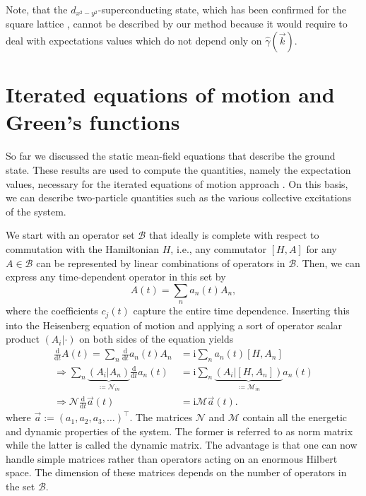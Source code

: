 \documentclass[
    reprint, 
    aps,
    preprintnumbers,
    twocolumn,
    prb,
    superscriptaddress
]{revtex4-2}
\newcommand{\vk}{\vec{k}}
\newcommand{\im}{\mathrm{i}}
\newcommand{\ddt}{\frac{\mathrm{d}}{\mathrm{d}t}}
\newcommand{\mM}{\mathcal{M}}
\newcommand{\mN}{\mathcal{N}}
\newcommand{\bs}{\begin{subequations}}
\newcommand{\es}{\end{subequations}}
\begin{document}
Note, that the $d_{x^2 - y^2}$-superconducting state, which has been confirmed for the square lattice 
\cite{Micnas88b,Huang13}, cannot be described by our method because it would require to 
deal with expectations values which do not depend only on $\widehat{\gamma}(\vk)$.


\section{Iterated equations of motion and Green's functions}
\label{sec:ieom}

So far we discussed the static mean-field equations that describe the ground state.
These results are used to compute the quantities, namely the expectation values, necessary for the iterated equations of motion approach \cite{uhrig09,hamerla13,hamerla14,bleicker18}.
On this basis, we can describe two-particle quantities such as the various collective excitations of the system.

We start with an operator set $\mathcal{B}$ that ideally is complete with respect to commutation with 
the Hamiltonian $H$, i.e., any commutator $[H, A]$ for any $A \in \mathcal{B}$ can be represented by linear combinations of operators in $\mathcal{B}$.
Then, we can express any time-dependent operator in this set by
\begin{equation}
    \label{eqn:time_dependent_operator}
    A(t) = \sum_n a_n(t) A_n,
\end{equation}
where the coefficients $c_j(t)$ capture the entire time dependence. 
Inserting this into the Heisenberg equation of motion and applying a sort of operator scalar product $(A_i|\cdot)$ 
on both sides of the equation yields
\bs
\begin{align}
        \ddt A(t) = \sum_n \ddt a_n(t) A_n &= \im \sum_n a_n(t) [H, A_n] \\
        \Rightarrow \sum_n \underbrace{(A_i | A_n)}_{\coloneqq \mN_{in}} \ddt a_n(t) &= 
				\im \sum_n \underbrace{(A_i | [H, A_n])}_{\coloneqq \mM_{in}} a_n(t) \\
        \Rightarrow \mN \ddt \vec{a}(t) &= \im \mM \vec{a}(t).
				    \label{eqn:heisenberg}
\end{align}
\es
where $\vec{a}:=(a_1, a_2, a_3,\ldots)^\top$.
The matrices $\mN$ and $\mM$ contain all the energetic and dynamic properties of the system.
The former is referred to as norm matrix while the latter is called the dynamic matrix.
The advantage is that one can now handle simple matrices rather than operators 
acting on an enormous Hilbert space.
The dimension of these matrices depends on the number of operators in the set $\mathcal{B}$.
\end{document}

